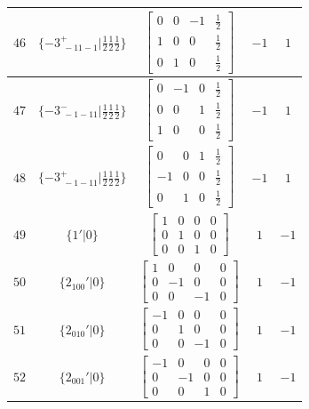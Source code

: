 \documentclass[fleqn,8pt]{jsarticle}
\begin{document}
\begin{longtable}{ccccc}
$ 46 $ & $ \{-3^{+}_{\,\,-11-1}|\frac{1}{2} \frac{1}{2} \frac{1}{2}\} $ & $ \begin{bmatrix} 0 & 0 & -1 & \frac{1}{2} \\ 1 & 0 & 0 & \frac{1}{2} \\ 0 & 1 & 0 & \frac{1}{2} \end{bmatrix} $ & $ -1 $ & $ 1 $ \\ \hline
$ 47 $ & $ \{-3^{-}_{\,\,-1-11}|\frac{1}{2} \frac{1}{2} \frac{1}{2}\} $ & $ \begin{bmatrix} 0 & -1 & 0 & \frac{1}{2} \\ 0 & 0 & 1 & \frac{1}{2} \\ 1 & 0 & 0 & \frac{1}{2} \end{bmatrix} $ & $ -1 $ & $ 1 $ \\ \hline
$ 48 $ & $ \{-3^{+}_{\,\,-1-11}|\frac{1}{2} \frac{1}{2} \frac{1}{2}\} $ & $ \begin{bmatrix} 0 & 0 & 1 & \frac{1}{2} \\ -1 & 0 & 0 & \frac{1}{2} \\ 0 & 1 & 0 & \frac{1}{2} \end{bmatrix} $ & $ -1 $ & $ 1 $ \\ \hline
$ 49 $ & $ \{1{}'|0\} $ & $ \begin{bmatrix} 1 & 0 & 0 & 0 \\ 0 & 1 & 0 & 0 \\ 0 & 0 & 1 & 0 \end{bmatrix} $ & $ 1 $ & $ -1 $ \\ \hline
$ 50 $ & $ \{2{}_{100}{}'|0\} $ & $ \begin{bmatrix} 1 & 0 & 0 & 0 \\ 0 & -1 & 0 & 0 \\ 0 & 0 & -1 & 0 \end{bmatrix} $ & $ 1 $ & $ -1 $ \\ \hline
$ 51 $ & $ \{2{}_{010}{}'|0\} $ & $ \begin{bmatrix} -1 & 0 & 0 & 0 \\ 0 & 1 & 0 & 0 \\ 0 & 0 & -1 & 0 \end{bmatrix} $ & $ 1 $ & $ -1 $ \\ \hline
$ 52 $ & $ \{2{}_{001}{}'|0\} $ & $ \begin{bmatrix} -1 & 0 & 0 & 0 \\ 0 & -1 & 0 & 0 \\ 0 & 0 & 1 & 0 \end{bmatrix} $ & $ 1 $ & $ -1 $ \\ \hline

\end{longtable}
\end{document}
